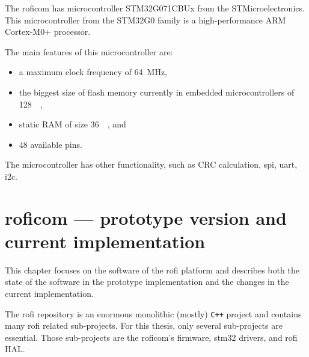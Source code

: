 \documentclass[
  digital,     %
  oneside,     %
  nosansbold,  %
  nocolorbold, %
  nolof,         %
  nolot,         %
]{fithesis4}
\newcommand{\TODO}[1]{\textcolor{red}{\textit{#1}}}
\newcommand{\TODOLIST}[1]{}
\begin{document}
{{{The \acrshort{roficom} has microcontroller STM32G071CBUx from the STMicroelectronics. This microcontroller from the STM32G0 family is a high-performance ARM Cortex-M0+ processor.

The main features of this microcontroller are:
\begin{itemize}
    \item a maximum clock frequency of \qty{64}{\mega\hertz},
    \item the biggest size of flash memory currently in embedded microcontrollers of \qty{128}{\kilo\byte},
    \item static RAM of size \qty{36}{\kilo\byte}, and
    \item 48 available pins.
\end{itemize}

The microcontroller has other functionality, such as CRC calculation, \acrshort{spi}, \acrshort{uart}, \acrshort{i2c}.


\chapter[ RoFICoM --- prototype version and current implementation ]{ \acrshort{roficom} --- prototype version and current implementation }
\TODOLIST{
\begin{itemize}
    \item Project structure/architecture
    \begin{itemize}
        \item suites
        \item Protocol
    \end{itemize}
    \item \texttt{control\_board}
    \item \texttt{stm32cxx}
    \item \texttt{rofi-hal}
\end{itemize}
}

This chapter focuses on the software of the \acrshort{rofi} platform and describes both the state of the software in the prototype implementation and the changes in the current implementation.

The \acrshort{rofi} repository is an enormous monolithic (mostly) \verb|C++| project and contains many \acrshort{rofi} related sub-projects. For this thesis, only several sub-projects are essential. Those sub-projects are the \acrshort{roficom}'s firmware, stm32 drivers, and \acrshort{rofi} HAL.

}}}
\end{document}
